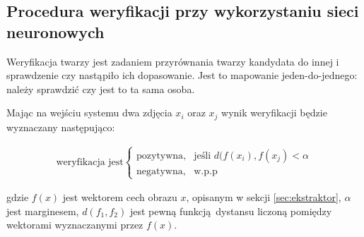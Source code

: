 

\subsection{Procedura weryfikacji przy wykorzystaniu sieci neuronowych}\label{sec:verify_process}

Weryfikacja twarzy jest zadaniem przyrównania twarzy kandydata 
do innej i sprawdzenie czy nastąpiło ich dopasowanie. Jest to mapowanie
jeden-do-jednego: należy sprawdzić czy jest to ta sama osoba.

Mając na wejściu systemu dwa zdjęcia \(x_i\) oraz \(x_j\) wynik weryfikacji będzie wyznaczany następująco:

\begin{align}\label{eq:ekstraktor_weryfikacja}
\text{weryfikacja jest}\begin{cases}
    \text{pozytywna},& \text{jeśli } d(f(x_i), f(x_j) < \alpha \\
    \text{negatywna},              & \text{w.p.p}
\end{cases}
\end{align}

gdzie \(f(x)\) jest wektorem cech obrazu \(x\), opisanym w sekcji
\ref{sec:ekstraktor}, \(\alpha\) jest marginesem, \(d(f_1, f_2)\) jest pewną funkcją dystansu liczoną pomiędzy wektorami wyznaczanymi przez \(f(x)\).
